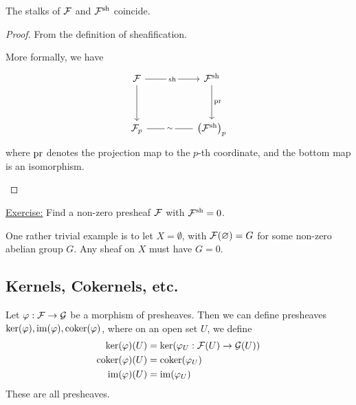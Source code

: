 \documentclass{article}
\begin{document}
\begin{corollary}
    The stalks of \(\mathcal{F}\) and \(\mathcal{F}^{\operatorname{sh}}\) coincide.
\end{corollary}

\begin{proof}
    From the definition of sheafification. \begin{addendum}
        More formally, we have
        \[\begin{tikzcd}
            \mcF && {\mcF^{\sh}} \\
            \\
            {\mcF_p} && {\left(\mcF^{\sh}\right)_p}
            \arrow["\pr", from=1-3, to=3-3]
            \arrow[from=1-1, to=3-1]
            \arrow["\sh"{description}, from=1-1, to=1-3]
            \arrow["\sim"{description}, no head, from=3-1, to=3-3]
        \end{tikzcd}\]
        where \(\operatorname{pr}\) denotes the projection map to the \(p\)-th coordinate, and the bottom map is an isomorphism.
    \end{addendum}
\end{proof}

\underline{Exercise:} Find a non-zero presheaf \(\mathcal{F}\) with \(\mathcal{F}^{\operatorname{sh}} = 0\). \begin{addendum}
    One rather trivial example is to let \(X = \emptyset\), with \(\mathcal{F}(\varnothing) = G\) for some non-zero abelian group \(G\). Any sheaf on \(X\) must have \(G = 0\).
\end{addendum}

\subsection{Kernels, Cokernels, etc.}

Let \(\varphi : \mathcal{F} \to \mathcal{G}\) be a morphism of presheaves. Then we can define presheaves \(\ker(\varphi), \operatorname{im}(\varphi), \operatorname{coker}(\varphi)\), where on an open set \(U\), we define
\begin{align*}
    \ker(\varphi)(U) &= \ker(\varphi_U : \mathcal{F}(U) \to \mathcal{G}(U)) \\
    \operatorname{coker}(\varphi)(U) &= \operatorname{coker}(\varphi_U) \\
    \operatorname{im}(\varphi)(U) &= \operatorname{im}(\varphi_U)
\end{align*}
These are all presheaves.
\end{document}
